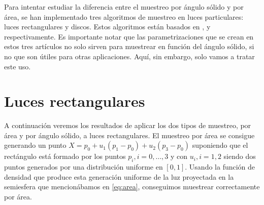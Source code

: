 \documentclass{scrbook}
\begin{document}
Para intentar estudiar la diferencia entre el muestreo por ángulo sólido y por área, se han implementado tres algoritmos de muestreo en luces particulares: luces rectangulares y discos. Estos algoritmos están basados en \cite{ur2013}, \cite{ur2017} y \cite{ur2018} respectivamente. Es importante notar que las parametrizaciones que se crean en estos tres artículos no solo sirven para muestrear en función del ángulo sólido, si no que son útiles para otras aplicaciones. Aquí, sin embargo, solo vamos a tratar este uso.
\section{Luces rectangulares}
\label{lucesrectangulares}
A continuación veremos los resultados de aplicar los dos tipos de muestreo, por área y por ángulo sólido, a luces rectangulares. El muestreo por área se consigue generando un punto $X = p_0 + u_1(p_1-p_0)+u_2(p_3-p_0)$ suponiendo que el rectángulo está formado por los puntos $p_i, i=0,\hdots,3$ y con $u_i, i =1,2$ siendo dos puntos generados por una distribución uniforme en $[0,1]$. Usando la función de densidad que produce esta generación uniforme de la luz proyectada en la semiesfera que mencionábamos en \ref{eq:area}, conseguimos muestrear correctamente por área.
\end{document}
